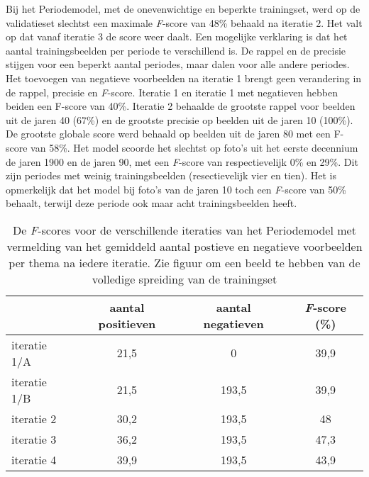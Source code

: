 Bij het Periodemodel, met de onevenwichtige en beperkte trainingset, werd op de validatieset slechtst een maximale \textit{F}-score van 48\% behaald na iteratie 2. Het valt op dat vanaf iteratie 3 de score weer daalt. Een mogelijke verklaring is dat het aantal trainingsbeelden per periode te verschillend is. De rappel en de precisie stijgen voor een beperkt aantal periodes, maar dalen voor alle andere periodes. Het toevoegen van negatieve voorbeelden na iteratie 1 brengt geen verandering in de rappel, precisie en \textit{F}-score. Iteratie 1 en iteratie 1 met negatieven hebben beiden een F-score van 40\%. Iteratie 2 behaalde de grootste rappel voor beelden uit de jaren 40 (67\%) en de grootste precisie op beelden uit de jaren 10 (100\%). De grootste globale score werd behaald op beelden uit de jaren 80 met een F-score van 58\%. Het model scoorde het slechtst op foto’s uit het eerste decennium de jaren 1900 en de jaren 90, met een \textit{F}-score van respectievelijk 0\% en 29\%. Dit zijn periodes met weinig trainingsbeelden (resectievelijk vier en tien). Het is opmerkelijk dat het model bij foto's van de jaren 10 toch een \textit{F}-score van 50\% behaalt, terwijl deze periode ook maar acht trainingsbeelden heeft.

\begin{table}
	\centering
	\begin{tabular}{l|cc|c}
		\toprule
		& aantal positieven  &  aantal negatieven &  \textit{F}-score (\%)\\
		\midrule
		iteratie 1/A & 21,5 & 0 & 39,9 \\
		iteratie 1/B & 21,5 & 193,5 & 39,9 \\
		iteratie 2 & 30,2 & 193,5 & 48 \\
		iteratie 3 & 36,2 & 193,5 & 47,3 \\
		iteratie 4 & 39,9 & 193,5 & 43,9 \\
		\bottomrule
	\end{tabular}
	\caption[De \textit{F}-scores voor de verschillende iteraties van het Periodemodel.]{De \textit{F}-scores voor de verschillende iteraties van het Periodemodel met vermelding van het gemiddeld aantal postieve en negatieve voorbeelden per thema na iedere iteratie. Zie figuur om een beeld te hebben van de volledige spreiding van de trainingset}
	\label{tab:validatie-periodemodel}
\end{table}

